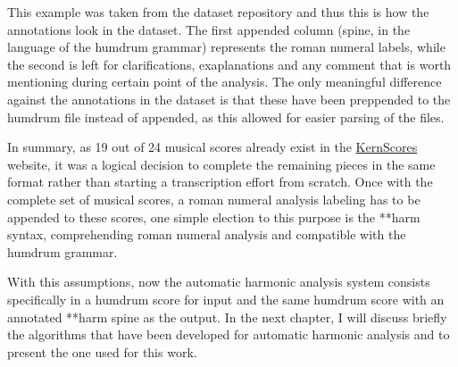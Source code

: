 This example was taken from the dataset repository and thus this is how the annotations look in the dataset. The first appended column (spine, in the language of the humdrum grammar) represents the roman numeral labels, while the second is left for clarifications, exaplanations and any comment that is worth mentioning during certain point of the analysis. The only meaningful difference against the annotations in the dataset is that these have been preppended to the humdrum file instead of appended, as this allowed for easier parsing of the files.

In summary, as 19 out of 24 musical scores already exist in the \href{http://kern.ccarh.org/}{KernScores} website, it was a logical decision to complete the remaining pieces in the same format rather than starting a transcription effort from scratch. Once with the complete set of musical scores, a roman numeral analysis labeling has to be appended to these scores, one simple election to this purpose is the **harm syntax, comprehending roman numeral analysis and compatible with the humdrum grammar.

With this assumptions, now the automatic harmonic analysis system consists specifically in a humdrum score for input and the same humdrum score with an annotated **harm spine as the output. In the next chapter, I will discuss briefly the algorithms that have been developed for automatic harmonic analysis and to present the one used for this work.


\newpage
